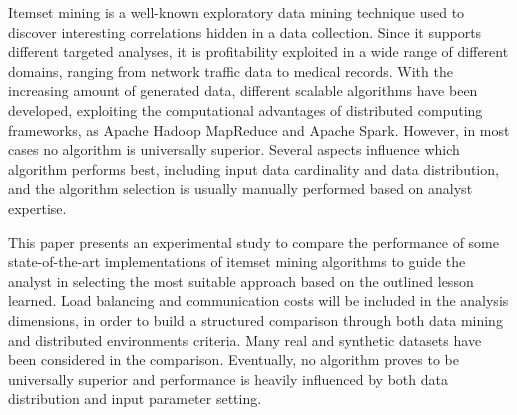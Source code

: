 Itemset mining is a well-known exploratory data mining technique used to
discover interesting correlations hidden in a data collection. Since it supports
different targeted analyses, it is profitability exploited in a wide range of
different domains, ranging from network traffic data to medical records. With
the increasing amount of generated data, different scalable algorithms have been
developed, exploiting the computational advantages of distributed computing
frameworks, as Apache Hadoop MapReduce and Apache Spark. However, in most cases
no algorithm is universally superior. Several aspects influence which algorithm
performs best, including input data cardinality and data distribution, and the
algorithm selection is usually manually performed based on analyst expertise.

This paper presents an experimental study to compare the performance of some
state-of-the-art implementations of itemset mining algorithms to guide the
analyst in selecting the most suitable approach based on the outlined lesson
learned. Load balancing and communication costs will be included in
the analysis dimensions, in order to build a structured comparison through both
data mining and distributed environments criteria. Many real and synthetic
datasets have been considered in the comparison.
Eventually, no algorithm proves to be universally superior
and performance is heavily influenced by both
data distribution and input parameter setting.
